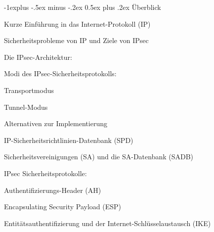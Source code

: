 \documentclass[a4paper]{article}
\makeatletter
\renewcommand{\subsection}{\@startsection{subsection}{2}{0mm}%
 {-1explus -.5ex minus -.2ex}%
 {0.5ex plus .2ex}%
 {\normalfont\normalsize\bfseries}}
\makeatother
\begin{document}
\begin{multicols}{3}
      \subsection{Überblick}
      \begin{itemize*}
            \item Kurze Einführung in das Internet-Protokoll (IP)
            \item Sicherheitsprobleme von IP und Ziele von IPsec
            \item Die IPsec-Architektur:
            \begin{itemize*}
                  \item Modi des IPsec-Sicherheitsprotokolls:
                  \begin{itemize*}
                        \item Transportmodus
                        \item Tunnel-Modus
                  \end{itemize*}
                  \item Alternativen zur Implementierung
                  \item IP-Sicherheitsrichtlinien-Datenbank (SPD)
                  \item Sicherheitsvereinigungen (SA) und die SA-Datenbank (SADB)
            \end{itemize*}
            \item IPsec Sicherheitsprotokolle:
            \begin{itemize*}
                  \item Authentifizierungs-Header (AH)
                  \item Encapsulating Security Payload (ESP)
            \end{itemize*}
            \item Entitätsauthentifizierung und der Internet-Schlüsselaustausch (IKE)
      \end{itemize*}


\end{multicols}
\end{document}

